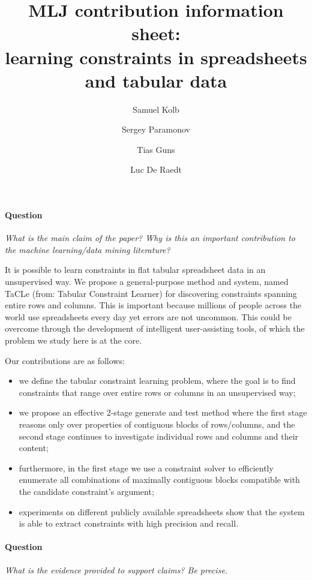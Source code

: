 \documentclass{article}
\author{Samuel Kolb \and Sergey Paramonov \and Tias Guns \and Luc {De Raedt}}
\title{MLJ contribution information sheet:\\ learning constraints in spreadsheets and tabular data}
\begin{document}
\maketitle

\paragraph{Question} \textit{What is the main claim of the paper? Why is this an important contribution to the machine learning/data mining literature?}


It is possible to learn constraints in flat tabular spreadsheet data in an unsupervised way. We propose a general-purpose method and system, named TaCLe (from: Tabular Constraint Learner) for discovering constraints spanning entire rows and columns. This is important because millions of people across the world use spreadsheets every day yet errors are not uncommon. This could be overcome through the development of intelligent user-assisting tools, of which the problem we study here is at the core.

Our contributions are as follows:
\begin{itemize}
  \item we define the tabular constraint learning problem, where the goal is to find constraints that range over entire rows or columns in an unsupervised way;
  \item we propose an effective 2-stage generate and test method where the first stage reasons only over properties of contiguous blocks of rows/columns, and the second stage continues to investigate individual rows and columns and their content;
  \item furthermore, in the first stage we use a constraint solver to efficiently enumerate all combinations of maximally contiguous blocks compatible with the candidate constraint's argument; 
  \item experiments on different publicly available spreadsheets show that the system is able to extract constraints with high precision and recall. 
\end{itemize}

\paragraph{Question} \textit{What is the evidence provided to support claims? Be precise.}
\end{document}
